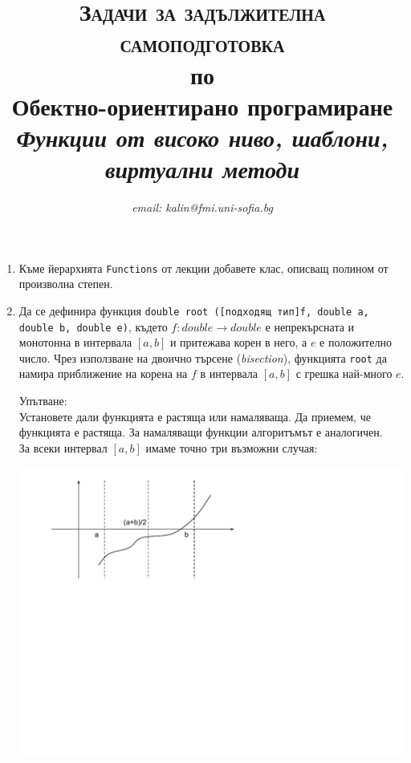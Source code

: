 \documentclass[12pt,a4paper]{article}
\author{\textit{email: kalin@fmi.uni-sofia.bg}}
\title{\textsc{Задачи за задължителна самоподготовка} \\
по \\
Обектно-ориентирано програмиране\\
\textit{Функции от високо ниво, шаблони, виртуални методи}}
\newcommand{\code}[1]{\texttt{#1}}
\begin{document}
\maketitle


\begin{enumerate}

	\item Къме йерархията \code{Functions} от лекции добавете клас, описващ полином от произволна степен.


	\item Да се дефинира функция \code{double root ([подходящ тип]f, double a, double b, double e)}, където
	 $f:double \rightarrow double$ е непрекърсната и монотонна в интервала $[a,b]$ и притежава корен в него, а $e$ е положително число. Чрез използване на двоично търсене (\textit{bisection}), функцията \code{root} да намира приближение на корена на $f$ в интервала $[a,b]$ с грешка най-много $e$.

	\begin{mdframed}[hidealllines=true,backgroundcolor=gray!20]
	Упътване:\\

	Установете дали функцията е растяща или намаляваща. Да приемем, че функцията е растяща. За намаляващи функции алгоритъмът е аналогичен. \\

	За всеки интервал $[a,b]$ имаме точно три възможни случая:\\

	\begin{center}
	\includegraphics[width=14.0cm]{images/function}
	\end{center}


\end{mdframed}
\end{enumerate}
\end{document}
